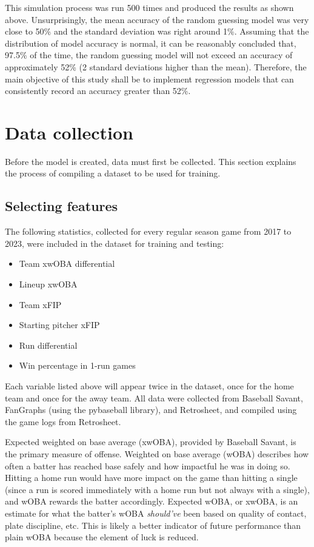 \documentclass{paper}
\begin{document}
This simulation process was run 500 times and produced the results as shown above. Unsurprisingly, the mean accuracy of the random guessing model was very close to 50\% and the standard deviation was right around 1\%. Assuming that the distribution of model accuracy is normal, it can be reasonably concluded that, 97.5\% of the time, the random guessing model will not exceed an accuracy of approximately 52\% (2 standard deviations higher than the mean). Therefore, the main objective of this study shall be to implement regression models that can consistently record an accuracy greater than 52\%.

\section{Data collection}
Before the model is created, data must first be collected. This section explains the process of compiling a dataset to be used for training.

\subsection{Selecting features}
The following statistics, collected for every regular season game from 2017 to 2023, were included in the dataset for training and testing:

\begin{itemize}
\item Team xwOBA differential
\item Lineup xwOBA
\item Team xFIP
\item Starting pitcher xFIP
\item Run differential
\item Win percentage in 1-run games
\end{itemize}

Each variable listed above will appear twice in the dataset, once for the home team and once for the away team. All data were collected from Baseball Savant, FanGraphs (using the pybaseball library), and Retrosheet, and compiled using the game logs from Retrosheet.

Expected weighted on base average (xwOBA), provided by Baseball Savant, is the primary measure of offense. Weighted on base average (wOBA) describes how often a batter has reached base safely and how impactful he was in doing so. Hitting a home run would have more impact on the game than hitting a single (since a run is scored immediately with a home run but not always with a single), and wOBA rewards the batter accordingly. Expected wOBA, or xwOBA, is an estimate for what the batter's wOBA \textit{should've} been based on quality of contact, plate discipline, etc. This is likely a better indicator of future performance than plain wOBA because the element of luck is reduced.
\end{document}
